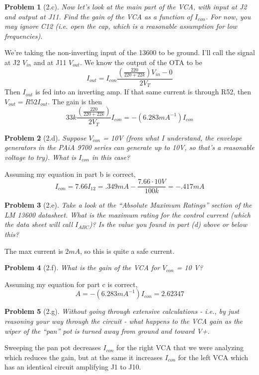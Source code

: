 \documentclass[12pt]{article}
\newtheorem*{prob}{Problem}
\begin{document}
\begin{prob}[2.c]{
  Now let's look at the main part of the VCA, with input at J2 and output at J11. Find the gain of the VCA as a function of $I_{con}$. For now, you may ignore C12 (i.e. open the cap, which is a reasonable assumption for low frequencies).
}\end{prob}
We're taking the non-inverting input of the 13600 to be ground. I'll call the signal at J2 $V_{in}$ and at J11 $V_{out}$. We know the output of the OTA to be
\[I_{out} = I_{con}\frac{\left(\frac{220}{220+22k}\right)V_{in} -0}{2V_T}\]
Then $I_{out}$ is fed into an inverting amp. If that same current is through R52, then $V_{out} = R52 I_{out}$. The gain is then
\[ 33k\frac{\left(\frac{220}{220+22k}\right)}{2V_T}I_{con} = -(6.283 mA^{-1})I_{con} \]

\begin{prob}[2.d]{
  Suppose $V_{con}$ = 10V (from what I understand, the envelope generators in the PAiA 9700 series can generate up to 10V, so that's a reasonable voltage to try). What is $I_{con}$ in this case?
}\end{prob}
Assuming my equation in part b is correct,
  \[ I_{con} = 7.66I_{12} = .349mA - \frac{7.66\cdot10V}{100k} = -.417 mA \]

\begin{prob}[2.e]{
  Take a look at the ``Absolute Maximum Ratings'' section of the LM 13600 datasheet. What is the maximum rating for the control current (which the data sheet will call $I_{ABC}$)? Is the value you found in part (d) above or below this?
}\end{prob}
The max current is $2mA$, so this is quite a safe current.

\begin{prob}[2.f]{
  What is the gain of the VCA for $V_{con}$ = 10 V?
}\end{prob}
Assuming my equation for part c is correct,
\[A = -(6.283 mA^{-1})I_{con} = 2.62347 \]

\begin{prob}[2.g]{
  Without going through extensive calculations - i.e., by just reasoning your way through the circuit - what happens to the VCA gain as the wiper of the ``pan'' pot is turned away from ground and toward V+.
}\end{prob}
Sweeping the pan pot decreases $I_{con}$ for the right VCA that we were analyzing which reduces the gain, but at the same it increases $I_{con}$ for the left VCA which has an identical circuit amplifying J1 to J10.
\end{document}
